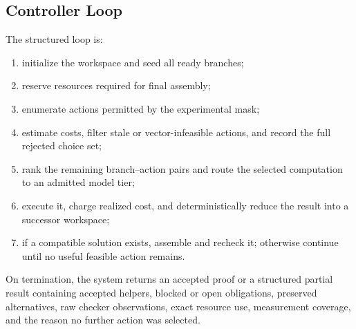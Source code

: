 \subsection{Controller Loop}

The structured loop is:

\begin{enumerate}
    \item initialize the workspace and seed all ready branches;
    \item reserve resources required for final assembly;
    \item enumerate actions permitted by the experimental mask;
    \item estimate costs, filter stale or vector-infeasible actions, and record
    the full rejected choice set;
    \item rank the remaining branch--action pairs and route the selected
    computation to an admitted model tier;
    \item execute it, charge realized cost, and deterministically reduce the
    result into a successor workspace;
    \item if a compatible solution exists, assemble and recheck it; otherwise
    continue until no useful feasible action remains.
\end{enumerate}

On termination, the system returns an accepted proof or a structured partial
result containing accepted helpers, blocked or open obligations, preserved
alternatives, raw checker observations, exact resource use, measurement
coverage, and the reason no further action was selected.
